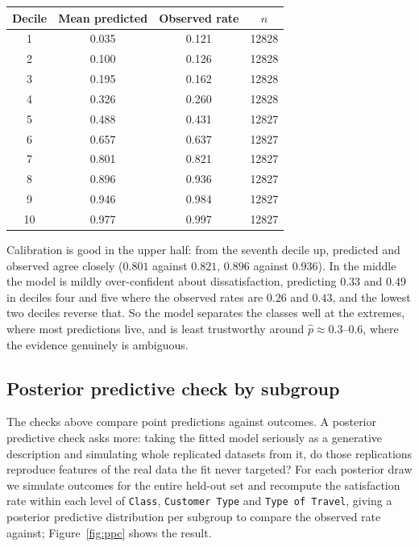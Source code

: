 \begin{table}[htbp]
  \centering
  \begin{minipage}[t]{0.44\linewidth}
    \vspace{0pt}   %
    \centering
    \small
    \setlength{\tabcolsep}{4pt}
    \label{tab:calibration}
    \begin{tabular}{cccc}
      \toprule
      Decile & Mean predicted & Observed rate & $n$ \\
      \midrule
      1  & 0.035 & 0.121 & \num{12828} \\
      2  & 0.100 & 0.126 & \num{12828} \\
      3  & 0.195 & 0.162 & \num{12828} \\
      4  & 0.326 & 0.260 & \num{12828} \\
      5  & 0.488 & 0.431 & \num{12827} \\
      6  & 0.657 & 0.637 & \num{12827} \\
      7  & 0.801 & 0.821 & \num{12827} \\
      8  & 0.896 & 0.936 & \num{12827} \\
      9  & 0.946 & 0.984 & \num{12827} \\
      10 & 0.977 & 0.997 & \num{12827} \\
      \bottomrule
    \end{tabular}
  \end{minipage}
  \hfill
  \begin{minipage}[t]{0.52\linewidth}
    \vspace{0pt}
    Calibration is good in the upper half: from the seventh decile up, predicted
    and observed agree closely ($0.801$ against $0.821$, $0.896$ against $0.936$).
    In the middle the model is mildly over-confident about dissatisfaction,
    predicting $0.33$ and $0.49$ in deciles four and five where the observed rates
    are $0.26$ and $0.43$, and the lowest two deciles reverse that. So the model
    separates the classes well at the extremes, where most predictions live, and
    is least trustworthy around $\hat{p} \approx 0.3$--$0.6$, where the evidence
    genuinely is ambiguous.
  \end{minipage}
\end{table}

\subsection{Posterior predictive check by subgroup}
\label{sec:pred-ppc}
The checks above compare point predictions against outcomes. A posterior
predictive check asks more: taking the fitted model seriously as a generative
description and simulating whole replicated datasets from it, do those
replications reproduce features of the real data the fit never targeted? For
each posterior draw we simulate outcomes for the entire held-out set and
recompute the satisfaction rate within each level of \texttt{Class},
\texttt{Customer Type} and \texttt{Type of Travel}, giving a posterior
predictive distribution per subgroup to compare the observed rate against;
Figure~\ref{fig:ppc} shows the result.

